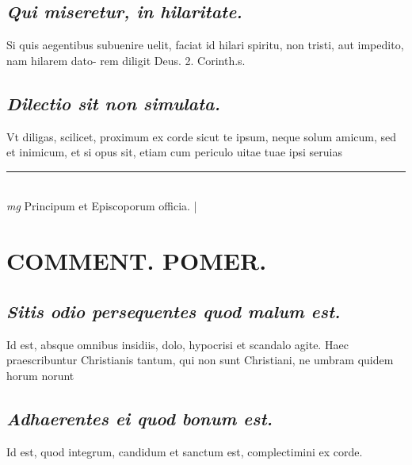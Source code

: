 \documentclass{article}
\begin{document}
\begin{pages}
\subsection*{\textit{Qui miseretur, in hilaritate. }}\pstart Si quis aegentibus subuenire uelit, faciat id hilari spiritu, non tristi, aut impedito, nam hilarem dato- rem diligit Deus. 2. Corinth.s.  \pend
{}
{}
\subsection*{\textit{Dilectio sit non simulata. }}\pstart Vt diligas, scilicet, proximum ex corde sicut te ipsum, neque solum amicum, sed et inimicum, et si opus sit, etiam cum periculo uitae tuae ipsi seruias  \pend
\vspace{0.5cm}\noindent
\vspace{0.2cm}\rule{1cm}{0.2pt}\\ 
\hspace{0.2cm}\textit{mg}
\footnotesize Principum et Episcoporum officia.  
\normalsize| 
\section*{COMMENT. POMER.  }
{}
\subsection*{\textit{Sitis odio persequentes quod malum est. }}\pstart Id est, absque omnibus insidiis, dolo, hypocrisi et scandalo agite. Haec praescribuntur Christianis tantum, qui non sunt Christiani, ne umbram quidem horum norunt  \pend
{}
{}
\subsection*{\textit{Adhaerentes ei quod bonum est. }}\pstart Id est, quod integrum, candidum et sanctum est, complectimini ex corde.  \pend
{}
{}

\end{pages}
\end{document}
